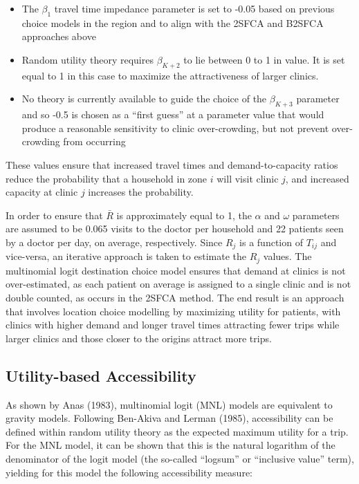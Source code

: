\documentclass[]{elsarticle} %
\providecommand{\tightlist}{%
  \setlength{\itemsep}{0pt}\setlength{\parskip}{0pt}}
\begin{document}
\begin{itemize}
\tightlist
\item
  The \(\beta_1\) travel time impedance parameter is set to -0.05 based
  on previous choice models in the region and to align with the 2SFCA
  and B2SFCA approaches above
\item
  Random utility theory requires \(\beta_{K+2}\) to lie between 0 to 1
  in value. It is set equal to 1 in this case to maximize the
  attractiveness of larger clinics.
\item
  No theory is currently available to guide the choice of the
  \(\beta_{K+3}\) parameter and so -0.5 is chosen as a ``first guess''
  at a parameter value that would produce a reasonable sensitivity to
  clinic over-crowding, but not prevent over-crowding from occurring
\end{itemize}

These values ensure that increased travel times and demand-to-capacity
ratios reduce the probability that a household in zone \(i\) will visit
clinic \(j\), and increased capacity at clinic \(j\) increases the
probability.

In order to ensure that \(\bar{R}\) is approximately equal to 1, the
\(\alpha\) and \(\omega\) parameters are assumed to be 0.065 visits to
the doctor per household and 22 patients seen by a doctor per day, on
average, respectively. Since \(R_j\) is a function of \(T_{ij}\) and
vice-versa, an iterative approach is taken to estimate the \(R_j\)
values. The multinomial logit destination choice model ensures that
demand at clinics is not over-estimated, as each patient on average is
assigned to a single clinic and is not double counted, as occurs in the
2SFCA method. The end result is an approach that involves location
choice modelling by maximizing utility for patients, with clinics with
higher demand and longer travel times attracting fewer trips while
larger clinics and those closer to the origins attract more trips.

\hypertarget{utility-based-accessibility}{%
\subsection{Utility-based
Accessibility}\label{utility-based-accessibility}}

As shown by Anas (1983), multinomial logit (MNL) models are equivalent
to gravity models. Following Ben-Akiva and Lerman (1985), accessibility
can be defined within random utility theory as the expected maximum
utility for a trip. For the MNL model, it can be shown that this is the
natural logarithm of the denominator of the logit model (the so-called
``logsum'' or ``inclusive value'' term), yielding for this model the
following accessibility measure:
\end{document}
